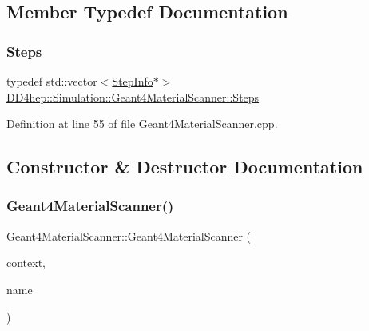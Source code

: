 \subsection{Member Typedef Documentation}
\hypertarget{class_d_d4hep_1_1_simulation_1_1_geant4_material_scanner_af5f8938342c8e56e7db11a372b8d4d9c}{}\label{class_d_d4hep_1_1_simulation_1_1_geant4_material_scanner_af5f8938342c8e56e7db11a372b8d4d9c} 
\subsubsection{\texorpdfstring{Steps}{Steps}}
{\footnotesize\ttfamily typedef std\+::vector$<$\hyperlink{class_d_d4hep_1_1_simulation_1_1_geant4_material_scanner_1_1_step_info}{Step\+Info}$\ast$$>$ \hyperlink{class_d_d4hep_1_1_simulation_1_1_geant4_material_scanner_af5f8938342c8e56e7db11a372b8d4d9c}{D\+D4hep\+::\+Simulation\+::\+Geant4\+Material\+Scanner\+::\+Steps}\hspace{0.3cm}{\ttfamily [protected]}}



Definition at line 55 of file Geant4\+Material\+Scanner.\+cpp.



\subsection{Constructor \& Destructor Documentation}
\hypertarget{class_d_d4hep_1_1_simulation_1_1_geant4_material_scanner_a29c140b5f46bc9ff863a845b79e546ee}{}\label{class_d_d4hep_1_1_simulation_1_1_geant4_material_scanner_a29c140b5f46bc9ff863a845b79e546ee} 
\subsubsection{\texorpdfstring{Geant4\+Material\+Scanner()}{Geant4MaterialScanner()}}
{\footnotesize\ttfamily Geant4\+Material\+Scanner\+::\+Geant4\+Material\+Scanner (\begin{DoxyParamCaption}\item[{\hyperlink{class_d_d4hep_1_1_simulation_1_1_geant4_context}{Geant4\+Context} $\ast$}]{context,  }\item[{const std\+::string \&}]{name }\end{DoxyParamCaption})}



